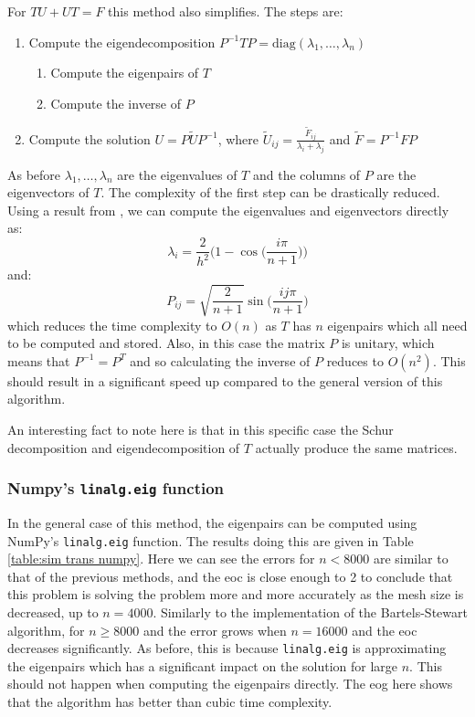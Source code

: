 \documentclass[11pt]{article}
\numberwithin{equation}{section}
\begin{document}
For $TU+UT=F$ this method also simplifies. The steps are: 
\begin{enumerate}
\item Compute the eigendecomposition $P^{-1}TP = \text{diag}(\lambda_1, \dots, \lambda_n)$
	\begin{enumerate}
	\item Compute the eigenpairs of $T$
	\item Compute the inverse of $P$
	\end{enumerate}
\item Compute the solution $U = P \widetilde{U} P^{-1}$, where $\widetilde{U}_{ij} = \frac{\widetilde{F}_{ij}}{\lambda_i + \lambda_j}$ and $\widetilde{F}=P^{-1}FP$
\end{enumerate}
As before $\lambda_1, \dots, \lambda_n$ are the eigenvalues of $T$ and the columns of $P$ are the eigenvectors of $T$. The complexity of the first step can be drastically reduced. Using a result from \cite{Elliott}, we can compute the eigenvalues and eigenvectors directly as:
\begin{equation} 
\lambda_i = \frac{2}{h^2} \Big( 1 - \cos \Big( \frac{i \pi}{n+1} \Big) \Big) 
\end{equation}
and:
\begin{equation}
P_{ij} = \sqrt{\frac{2}{n+1}} \sin \Big( \frac{ij \pi}{n+1}  \Big) 
\end{equation}
which reduces the time complexity to $O(n)$ as $T$ has $n$ eigenpairs which all need to be computed and stored. Also, in this case the matrix $P$ is unitary, which means that $P^{-1} = P^T$ and so calculating the inverse of $P$ reduces to $O(n^2)$. This should result in a significant speed up compared to the general version of this algorithm.

An interesting fact to note here is that in this specific case the Schur decomposition and eigendecomposition of $T$ actually produce the same matrices. 

\subsubsection*{Numpy's \texttt{linalg.eig} function}
In the general case of this method, the eigenpairs can be computed using NumPy's \texttt{linalg.eig} function. The results doing this are given in Table \ref{table:sim trans numpy}. Here we can see the errors for $n<8000$ are similar to that of the previous methods, and the eoc is close enough to 2 to conclude that this problem is solving the problem more and more accurately as the mesh size is decreased, up to $n=4000$. Similarly to the implementation of the Bartels-Stewart algorithm, for $n\geq 8000$ and the error grows when $n=16000$ and the eoc decreases significantly. As before, this is because \texttt{linalg.eig} is approximating the eigenpairs which has a significant impact on the solution for large $n$. This should not happen when computing the eigenpairs directly. The eog here shows that the algorithm has better than cubic time complexity.
\end{document}
